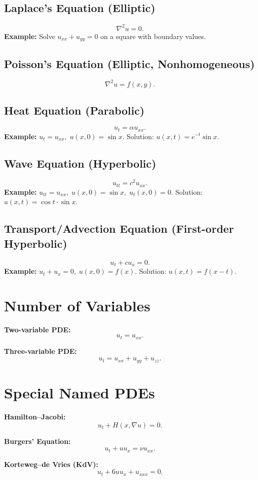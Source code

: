 \documentclass[12pt]{book}
\begin{document}
\section*{Laplace’s Equation (Elliptic)}
\[
\nabla^2 u = 0.
\]
\textbf{Example:} Solve $u_{xx}+u_{yy}=0$ on a square with boundary values.

\section*{Poisson’s Equation (Elliptic, Nonhomogeneous)}
\[
\nabla^2 u = f(x,y).
\]

\section*{Heat Equation (Parabolic)}
\[
u_t = \alpha u_{xx}.
\]
\textbf{Example:} $u_t = u_{xx}, \; u(x,0) = \sin x$.  
Solution: $u(x,t) = e^{-t}\sin x$.

\section*{Wave Equation (Hyperbolic)}
\[
u_{tt} = c^2 u_{xx}.
\]
\textbf{Example:} $u_{tt} = u_{xx}, \; u(x,0) = \sin x, \; u_t(x,0)=0$.  
Solution: $u(x,t) = \cos t \cdot \sin x$.

\section*{Transport/Advection Equation (First-order Hyperbolic)}
\[
u_t + c u_x = 0.
\]
\textbf{Example:} $u_t + u_x = 0, \; u(x,0) = f(x)$.  
Solution: $u(x,t) = f(x-t)$.

\chapter{Number of Variables}
\textbf{Two-variable PDE:}
\[
u_t = u_{xx}.
\]

\textbf{Three-variable PDE:}
\[
u_t = u_{xx}+u_{yy}+u_{zz}.
\]

\chapter{Special Named PDEs}
\textbf{Hamilton--Jacobi:}
\[
u_t + H(x,\nabla u) = 0.
\]

\textbf{Burgers’ Equation:}
\[
u_t + u u_x = \nu u_{xx}.
\]

\textbf{Korteweg--de Vries (KdV):}
\[
u_t + 6u u_x + u_{xxx} = 0.
\]
\end{document}
